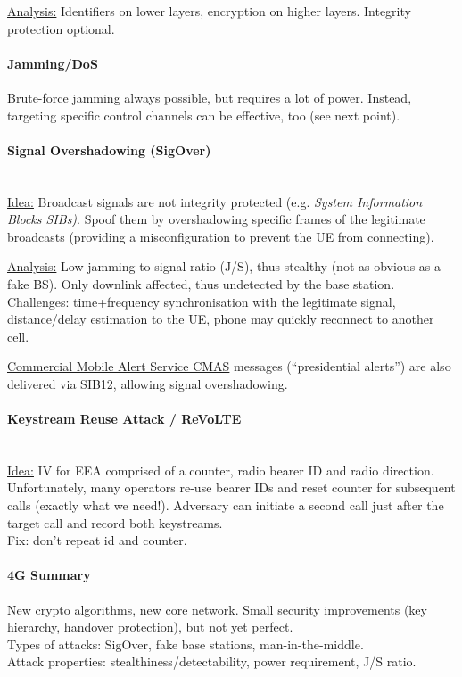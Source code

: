 \underline{Analysis:}
Identifiers on lower layers, encryption on higher layers.
Integrity protection optional.

\paragraph{Jamming/DoS}
Brute-force jamming always possible, but requires a lot of power.
Instead, targeting specific control channels can be effective, too (see next point).

\paragraph{Signal Overshadowing (SigOver)} \mbox{} \\
\underline{Idea:}
Broadcast signals are not integrity protected (e.g. \textit{System Information Blocks SIBs)}.
Spoof them by overshadowing specific frames of the legitimate broadcasts (providing a misconfiguration to prevent the UE from connecting).

\underline{Analysis:}
Low jamming-to-signal ratio (J/S), thus stealthy (not as obvious as a fake BS).
Only downlink affected, thus undetected by the base station.
Challenges: time+frequency synchronisation with the legitimate signal, distance/delay estimation to the UE, phone may quickly reconnect to another cell.

\underline{Commercial Mobile Alert Service CMAS} messages (``presidential alerts'') are also delivered via SIB12, allowing signal overshadowing.

\paragraph{Keystream Reuse Attack / ReVoLTE} \mbox{} \\
\underline{Idea:} IV for EEA comprised of a counter, radio bearer ID and radio direction.
\\
Unfortunately, many operators re-use bearer IDs and reset counter for subsequent calls (exactly what we need!).
Adversary can initiate a second call just after the target call and record both keystreams.
\\
Fix: don't repeat id and counter.

\paragraph{4G Summary}
New crypto algorithms, new core network.
Small security improvements (key hierarchy, handover protection), but not yet perfect.
\\
Types of attacks: SigOver, fake base stations, man-in-the-middle.
\\
Attack properties: stealthiness/detectability, power requirement, J/S ratio.


